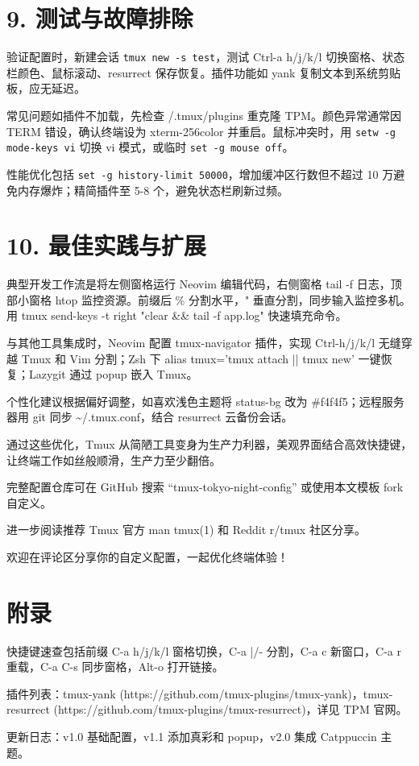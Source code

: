 \chapter{9. 测试与故障排除}
验证配置时，新建会话 \texttt{tmux new -s test}，测试 Ctrl-a h/j/k/l 切换窗格、状态栏颜色、鼠标滚动、resurrect 保存恢复。插件功能如 yank 复制文本到系统剪贴板，应无延迟。\par
常见问题如插件不加载，先检查 /.tmux/plugins 重克隆 TPM。颜色异常通常因 TERM 错设，确认终端设为 xterm-256color 并重启。鼠标冲突时，用 \texttt{setw -g mode-keys vi} 切换 vi 模式，或临时 \texttt{set -g mouse off}。\par
性能优化包括 \texttt{set -g history-limit 50000}，增加缓冲区行数但不超过 10 万避免内存爆炸；精简插件至 5-8 个，避免状态栏刷新过频。\par
\chapter{10. 最佳实践与扩展}
典型开发工作流是将左侧窗格运行 Neovim 编辑代码，右侧窗格 tail -f 日志，顶部小窗格 htop 监控资源。前缀后 \%{} 分割水平，" 垂直分割，同步输入监控多机。用 tmux send-keys -t right "clear \&{}\&{} tail -f app.log" 快速填充命令。\par
与其他工具集成时，Neovim 配置 tmux-navigator 插件，实现 Ctrl-h/j/k/l 无缝穿越 Tmux 和 Vim 分割；Zsh 下 alias tmux='tmux attach || tmux new' 一键恢复；Lazygit 通过 popup 嵌入 Tmux。\par
个性化建议根据偏好调整，如喜欢浅色主题将 status-bg 改为 \#{}f4f4f5；远程服务器用 git 同步 \~{}/.tmux.conf，结合 resurrect 云备份会话。\par
通过这些优化，Tmux 从简陋工具变身为生产力利器，美观界面结合高效快捷键，让终端工作如丝般顺滑，生产力至少翻倍。\par
完整配置仓库可在 GitHub 搜索 “tmux-tokyo-night-config” 或使用本文模板 fork 自定义。\par
进一步阅读推荐 Tmux 官方 man tmux(1) 和 Reddit r/tmux 社区分享。\par
欢迎在评论区分享你的自定义配置，一起优化终端体验！\par
\chapter{附录}
快捷键速查包括前缀 C-a h/j/k/l 窗格切换，C-a |/- 分割，C-a c 新窗口，C-a r 重载，C-a C-s 同步窗格，Alt-o 打开链接。\par
插件列表：tmux-yank (https://github.com/tmux-plugins/tmux-yank)，tmux-resurrect (https://github.com/tmux-plugins/tmux-resurrect)，详见 TPM 官网。\par
更新日志：v1.0 基础配置，v1.1 添加真彩和 popup，v2.0 集成 Catppuccin 主题。\par

